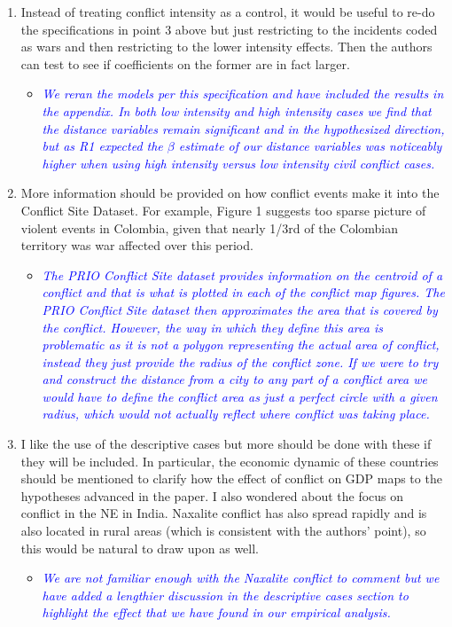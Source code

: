 \begin{enumerate}
\item Instead of treating conflict intensity as a control, it would be useful to re-do the specifications in point 3 above but just restricting to the incidents coded as wars and then restricting to the lower intensity effects. Then the authors can test to see if coefficients on the former are in fact larger.

\begin{itemize}
\item \textcolor{blue}{\emph{
	We reran the models per this specification and have included the results in the appendix. In both low intensity and high intensity cases we find that the distance variables remain significant and in the hypothesized direction, but as R1 expected the $\beta$ estimate of our distance variables was noticeably higher when using high intensity versus low intensity civil conflict cases. 
}}
\end{itemize}

\item More information should be provided on how conflict events make it into the Conflict Site Dataset. For example, Figure 1 suggests too sparse picture of violent events in Colombia, given that nearly 1/3rd of the Colombian territory was war affected over this period.

\begin{itemize}
\item \textcolor{blue}{\emph{
	The PRIO Conflict Site dataset provides information on the centroid of a conflict and that is what is plotted in each of the conflict map figures. The PRIO Conflict Site dataset then approximates the area that is covered by the conflict. However, the way in which they define this area is problematic as it is not a polygon representing the actual area of conflict, instead they just provide the radius of the conflict zone. If we were to try and construct the distance from a city to any part of a conflict area we would have to define the conflict area as just a perfect circle with a given radius, which would not actually reflect where conflict was taking place. 
}}
\end{itemize}

\item I like the use of the descriptive cases but more should be done with these if they will be included. In particular, the economic dynamic of these countries should be mentioned to clarify how the effect of conflict on GDP maps to the hypotheses advanced in the paper. I also wondered about the focus on conflict in the NE in India. Naxalite conflict has also spread rapidly and is also located in rural areas (which is consistent with the authors’ point), so this would be natural to draw upon as well.

\begin{itemize}
\item \textcolor{blue}{\emph{
	We are not familiar enough with the Naxalite conflict to comment but we have added a lengthier discussion in the descriptive cases section to highlight the effect that we have found in our empirical analysis.
}}
\end{itemize}

\end{enumerate}